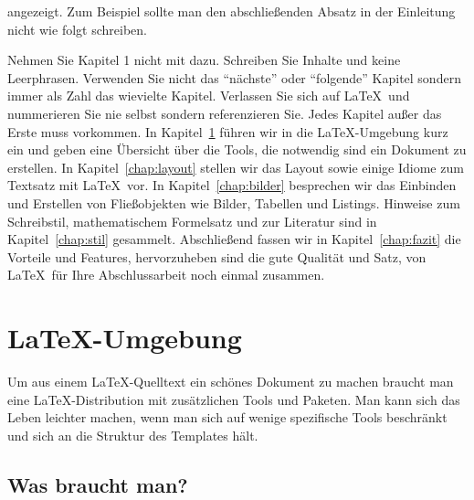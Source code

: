 \documentclass[11pt,a4paper]{report}
\begin{document}
 angezeigt. 
Zum Beispiel sollte man den abschließenden Absatz in der Einleitung 
nicht wie folgt schreiben.

Nehmen Sie Kapitel 1 nicht mit dazu. Schreiben Sie Inhalte und keine
Leerphrasen. Verwenden Sie nicht das "`nächste"' oder "`folgende"' Kapitel
sondern immer als Zahl das wievielte Kapitel. 
Verlassen Sie sich auf \LaTeX\ und nummerieren Sie nie selbst sondern
referenzieren Sie. Jedes Kapitel außer das Erste muss vorkommen. 
In Kapitel~\ref{chap:latex} führen wir in die \LaTeX-Umgebung kurz ein und 
geben eine Übersicht über die Tools, die notwendig sind ein Dokument zu 
erstellen.
In Kapitel~\ref{chap:layout} stellen wir das Layout sowie einige Idiome 
zum Textsatz mit \LaTeX\ vor. 
In Kapitel~\ref{chap:bilder} besprechen wir das Einbinden und Erstellen 
von Fließobjekten wie Bilder, Tabellen und Listings.
Hinweise zum Schreibstil, mathematischem Formelsatz und zur Literatur sind 
in Kapitel~\ref{chap:stil} gesammelt.
Abschließend fassen wir in Kapitel~\ref{chap:fazit} die Vorteile und Features,
hervorzuheben sind die gute Qualität und Satz,
von \LaTeX\ für Ihre Abschlussarbeit noch einmal zusammen.


\chapter{\LaTeX-Umgebung} \label{chap:latex}

Um aus einem \LaTeX-Quelltext ein schönes Dokument zu machen braucht man 
eine \LaTeX-Distribution mit zusätzlichen Tools und Paketen. 
Man kann sich das Leben leichter machen, wenn man sich auf wenige spezifische
Tools beschränkt und sich an die Struktur des Templates hält.


\section{Was braucht man?} \label{sec:was}
\end{document}
